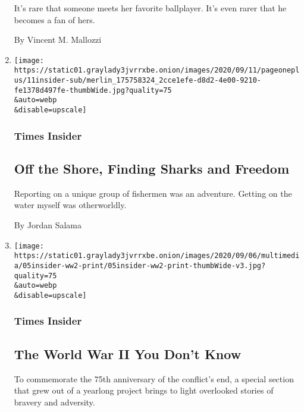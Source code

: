 \begin{enumerate}
  It's rare that someone meets her favorite ballplayer. It's even rarer
  that he becomes a fan of hers.

  By Vincent M. Mallozzi
\item
  \href{/2020/09/06/insider/shark-fishing.html}{}

  \texttt{[image: https://static01.graylady3jvrrxbe.onion/images/2020/09/11/pageoneplus/11insider-sub/merlin\_175758324\_2cce1efe-d8d2-4e00-9210-fe1378d497fe-thumbWide.jpg?quality=75\\\&auto=webp\\\&disable=upscale]}

  \hypertarget{times-insider-4}{%
  \subsubsection{Times Insider}\label{times-insider-4}}

  \hypertarget{off-the-shore-finding-sharks-and-freedom}{%
  \subsection{Off the Shore, Finding Sharks and
  Freedom}\label{off-the-shore-finding-sharks-and-freedom}}

  Reporting on a unique group of fishermen was an adventure. Getting on
  the water myself was otherworldly.

  By Jordan Salama
\item
  \href{/2020/09/05/insider/World-War-II-end.html}{}

  \texttt{[image: https://static01.graylady3jvrrxbe.onion/images/2020/09/06/multimedia/05insider-ww2-print/05insider-ww2-print-thumbWide-v3.jpg?quality=75\\\&auto=webp\\\&disable=upscale]}

  \hypertarget{times-insider-5}{%
  \subsubsection{Times Insider}\label{times-insider-5}}

  \hypertarget{the-world-war-ii-you-dont-know}{%
  \subsection{The World War II You Don't
  Know}\label{the-world-war-ii-you-dont-know}}

  To commemorate the 75th anniversary of the conflict's end, a special
  section that grew out of a yearlong project brings to light overlooked
  stories of bravery and adversity.


\end{enumerate}
